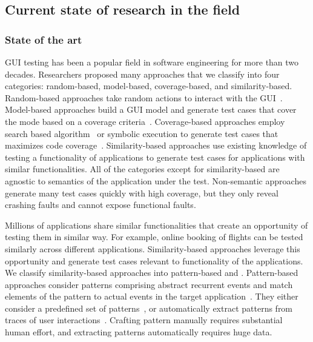 \subsection{Current state of research in the field }



\subsubsection{State of the art}
GUI testing has been a popular field in software engineering for more than two decades. Researchers proposed many approaches that we classify into four categories:
 random-based, model-based, coverage-based, and  similarity-based.
Random-based approaches take random actions to interact with  the GUI~\cite{machiry:dynodroid:FSE:2013,vos:testar:ijismd:2015,ermuth:monkey:ISSTA:2016}.
Model-based approaches build a GUI model and generate test cases that cover the mode based on a coverage criteria~\cite{Nguyen:GUITAR:ASEJ:2014,Li:DroidiBot:ICSE-C:2017,Gu:PractivalTest:ICSE:2019,Choi:swift:OOPSLA:2013}. 
Coverage-based approaches employ search based algorithm~\cite{Gross:exist:ISSTA:2012,mahmood:evodroid:FSE:2014,dong:TimaMachine:ICSE:2020} or symbolic execution  to generate test cases that maximizes code coverage~\cite{Ganov:GUIsymbolic:FMSE:2009,cheng:guicat:ASE:2016,Anand:conc:FSE:2012}.
Similarity-based approaches use existing knowledge of testing a functionality of applications to generate test cases for applications with similar functionalities.
All of the categories except for similarity-based are agnostic to semantics of the application under the test. 
Non-semantic approaches generate many test cases quickly with high coverage, but they only reveal crashing faults and cannot expose functional faults.

\smallskip 
Millions of applications share similar functionalities that create an opportunity of testing them in similar way.
For example, online booking of flights can be tested similarly across different applications. 
Similarity-based approaches leverage this opportunity and generate test cases relevant to functionality of the applications.
We classify similarity-based approaches into pattern-based and \testreuse.
Pattern-based approaches consider patterns comprising abstract recurrent events and match  elements of the pattern to actual events in the target application~\cite{Moreira:pattern:ISSRE:2013,Morgado:Impact:HCI:2019}.
They either consider a predefined set of patterns~\cite{Mariani:Augusto:ICSE:2018,Hu:appflow:FSE:2018}, or automatically extract patterns from traces of user interactions~\cite{linares:mining:MSR:2015,mao:crowd:ASE:2017,Mao:UserPattern:JSS:2021}.
Crafting pattern manually requires substantial human effort, and extracting patterns automatically requires huge data.


